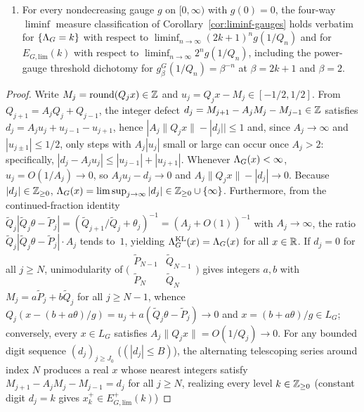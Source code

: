 \begin{theorem}
\begin{enumerate}[label=(\roman*),leftmargin=2.2em]
\begin{enumerate}[label=(\alph*),leftmargin=1.6em]
$E_{G,\mathrm{lim}}^\pm(k)=x_k^\pm+L_G$ for explicit telescoping witnesses
$x_k^\pm\in E_{G,\mathrm{lim}}^\pm(k)$; and
\item For every nondecreasing gauge $g$ on $[0,\infty)$ with $g(0)=0$, the four-way
$\liminf$ measure classification of Corollary~\ref{cor:liminf-gauges} holds verbatim
for $\{\Lambda_G=k\}$ with respect to $\liminf_{n\to\infty}(2k+1)^n g(1/Q_n)$ and for
$E_{G,\mathrm{lim}}(k)$ with respect to $\liminf_{n\to\infty}2^n g(1/Q_n)$, including
the power-gauge threshold dichotomy for $g_\beta^G(1/Q_n)=\beta^{-n}$ at $\beta=2k+1$
and $\beta=2$.
\end{enumerate}
\end{enumerate}
\end{theorem}

\begin{proof}
Write $M_j=\mathrm{round}(Q_j x)\in\mathbb{Z}$ and $u_j=Q_j x-M_j\in[-1/2,1/2]$. From
$Q_{j+1}=A_jQ_j+Q_{j-1}$, the integer defect $d_j=M_{j+1}-A_jM_j-M_{j-1}\in\mathbb{Z}$
satisfies $d_j=A_ju_j+u_{j-1}-u_{j+1}$, hence $|A_j\|Q_j x\|-|d_j||\le 1$ and,
since $A_j\to\infty$ and $|u_{j\pm1}|\le 1/2$, only steps with $A_j|u_j|$ small or
large can occur once $A_j>2$: specifically, $|d_j-A_j u_j|\le|u_{j-1}|+|u_{j+1}|$.
Whenever $\Lambda_G(x)<\infty$, $u_j=O(1/A_j)\to0$, so $A_j u_j-d_j\to0$ and
$A_j\|Q_j x\|-|d_j|\to0$. Because $|d_j|\in\mathbb{Z}_{\ge0}$, $\Lambda_G(x)=\limsup_{j\to\infty}|d_j|\in\mathbb{Z}_{\ge0}\cup\{\infty\}$.
Furthermore, from the continued-fraction identity
$\widetilde Q_j|\widetilde Q_j\theta-\widetilde P_j|=(\widetilde Q_{j+1}/\widetilde Q_j+\theta_j)^{-1}=(A_j+O(1))^{-1}$
with $A_j\to\infty$, the ratio $\widetilde Q_j|\widetilde Q_j\theta-\widetilde P_j|\cdot A_j$
tends to~$1$, yielding $\Lambda_G^{\mathrm{KL}}(x)=\Lambda_G(x)$ for all $x\in\mathbb{R}$.
If $d_j=0$ for all $j\ge N$, unimodularity of
$\bigl(\begin{smallmatrix}\widetilde P_{N-1}&\widetilde Q_{N-1}\\\widetilde P_N&\widetilde Q_N\end{smallmatrix}\bigr)$
gives integers $a,b$ with $M_j=a\widetilde P_j+b\widetilde Q_j$ for all $j\ge N-1$,
whence $Q_j(x-(b+a\theta)/g)=u_j+a(\widetilde Q_j\theta-\widetilde P_j)\to0$ and
$x=(b+a\theta)/g\in L_G$; conversely, every $x\in L_G$ satisfies $A_j\|Q_j x\|=O(1/Q_j)\to0$.
For any bounded digit sequence $(d_j)_{j\ge J_0}$ ($(|d_j|\le B)$), the alternating
telescoping series around index $N$ produces a real $x$ whose nearest integers
satisfy $M_{j+1}-A_j M_j-M_{j-1}=d_j$ for all $j\ge N$, realizing every level
$k\in\mathbb{Z}_{\ge0}$ (constant digit $d_j=k$ gives $x_k^+\in E_{G,\mathrm{lim}}^+(k)$)

\end{proof}
